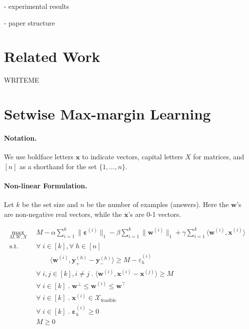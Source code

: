 \documentclass{article}
\renewcommand\[{\begin{equation}}
\renewcommand\]{\end{equation}}
\newcommand{\calvar}[1]{\ensuremath{\mathcal{#1}}}
\newcommand{\calX}{\calvar{X}}
\newcommand{\vecvar}[1]{\ensuremath{\boldsymbol{#1}}}
\newcommand{\vw}{\vecvar{w}}
\newcommand{\vx}{\vecvar{x}}
\newcommand{\vy}{\vecvar{y}}
\newcommand{\veps}{\vecvar{\varepsilon}}
\begin{document}
- experimental results

- paper structure


\section{Related Work}

WRITEME

\section{Setwise Max-margin Learning}

\paragraph{Notation.} We use boldface letters $\vx$ to indicate vectors,
capital letters $X$ for matrices, and $[n]$ as a shorthand for the set $\{1, \ldots, n\}$.

\paragraph{Non-linear Formulation.}

Let $k$ be the set size and $n$ be the number of examples (answers). Here
the $\vw$'s are non-negative real vectors, while the $\vx$'s are 0-1
vectors.

{\footnotesize

\begin{align}
    \max_{M, W, X}
        & \;\; M - \alpha \sum_{i=1}^k \| \veps^{(i)} \|_1 - \beta \sum_{i=1}^k \| \vw^{(i)} \|_1 + \gamma \sum_{i=1}^k \langle \vw^{(i)}, \vx^{(i)} \rangle
        \nonumber
    \\
    \text{s.t.}
        & \;\; \forall \; i \in [k], \forall \; h \in [n] \nonumber
    \\
        & \;\; \qquad \langle \vw^{(i)}, \vy^{(h)}_+ - \vy^{(h)}_- \rangle \geq M - \varepsilon^{(i)}_h
    \\
        & \;\; \forall \; i, j \in [k], i \neq j \;.\; \langle \vw^{(i)}, \vx^{(i)} - \vx^{(j)} \rangle \geq M \label{eq:wxconstr}
    \\
        & \;\; \forall \; i \in [k] \;.\; \vw^\bot \leq \vw^{(i)} \leq \vw^\top \label{eq:wbounds}
    \\
        & \;\; \forall \; i \in [k] \;.\; \vx^{(i)} \in \calX_{\text{feasible}}
    \\
        & \;\; \forall \; i \in [k] \;.\; \veps^{(i)}_h \geq 0
    \\
        & \;\; M \geq 0
\end{align}

}
\end{document}
